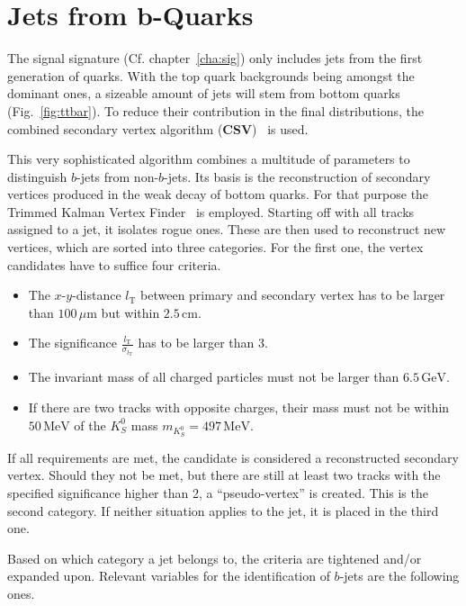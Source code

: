 \section{Jets from b-Quarks}
\label{sec:bjets}

The signal signature (Cf. chapter~\ref{cha:sig}) only includes jets from the first generation of quarks. With the top quark backgrounds being amongst the dominant ones, a sizeable amount of jets will stem from bottom quarks (Fig.~\ref{fig:ttbar}). To reduce their contribution in the final distributions, the combined secondary vertex algorithm (\textbf{CSV})~\cite{csvbtag} is used. 

This very sophisticated algorithm combines a multitude of parameters to distinguish $b$-jets from non-$b$-jets. Its basis is the reconstruction of secondary vertices produced in the weak decay of bottom quarks. For that purpose the Trimmed Kalman Vertex Finder~\cite{kalmanvtx} is employed. Starting off with all tracks assigned to a jet, it isolates rogue ones. These are then used to reconstruct new vertices, which are sorted into three categories. For the first one, the vertex candidates have to suffice four criteria.

\begin{itemize}
\item The $x$-$y$-distance $l_{\text{T}}$ between primary and secondary vertex has to be larger than $100\,\mu\text{m}$ but within $2.5\,\text{cm}$.
\item The significance $\frac{l_{\text{T}}}{\sigma_{l_{\text{T}}}}$ has to be larger than $3$.
\item The invariant mass of all charged particles must not be larger than $6.5\,\text{GeV}$.
\item If there are two tracks with opposite charges, their mass must not be within $50\,\text{MeV}$ of the $K^0_S$ mass $m_{K^0_S} = 497\,\text{MeV}$.
\end{itemize}

\noindent If all requirements are met, the candidate is considered a reconstructed secondary vertex. Should they not be met, but there are still at least two tracks with the specified significance higher than 2, a ``pseudo-vertex'' is created. This is the second category. If neither situation applies to the jet, it is placed in the third one.

Based on which category a jet belongs to, the criteria are tightened and/or expanded upon. Relevant variables for the identification of $b$-jets are the following ones.

